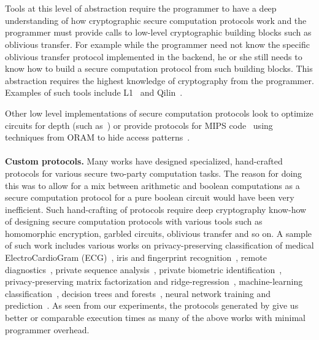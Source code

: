 \\\\
 Tools at this level of abstraction require the programmer to have a deep understanding of how cryptographic secure computation protocols work and the programmer must provide calls to low-level cryptographic building blocks such as oblivious transfer. For example while the programmer need not know the specific oblivious transfer protocol implemented in the backend, he or she still needs to know how to build a secure computation protocol from such building blocks. This abstraction requires the highest knowledge of cryptography from the programmer. Examples of such tools include L1~\cite{lone} and Qilin~\cite{qilin}.


Other low level implementations of secure computation protocols look to optimize circuits for depth (such as~\cite{ddkssz15}) or provide protocols for MIPS code~\cite{mips} using techniques from ORAM to hide access patterns~\cite{oram1,oram2}.
\\\\
\noindent\textbf{Custom \mpc protocols.} Many works have designed specialized, hand-crafted protocols for various secure two-party computation tasks. The reason for doing this was to allow for a mix between arithmetic and boolean computations as a secure computation protocol for a pure boolean circuit would have been very inefficient. Such hand-crafting of protocols require deep cryptography know-how of designing secure computation protocols with various tools such as homomorphic encryption, garbled circuits, oblivious transfer and so on. A sample of such work includes various works on privacy-preserving classification of medical ElectroCardioGram (ECG)~\cite{barni}, iris and fingerprint recognition~\cite{blanton}, remote diagnostics~\cite{brickell}, private sequence analysis~\cite{franz}, private biometric identification~\cite{huang}, privacy-preserving matrix factorization and ridge-regression~\cite{valeriaMatrix, valeriaRidge}, machine-learning classification~\cite{shafindss}, decision trees and forests~\cite{wu}, neural network training and prediction~\cite{secureml,minionn}. As seen from our experiments, the protocols generated by \tool give us better or comparable execution times as many of the above works with minimal programmer overhead. %

